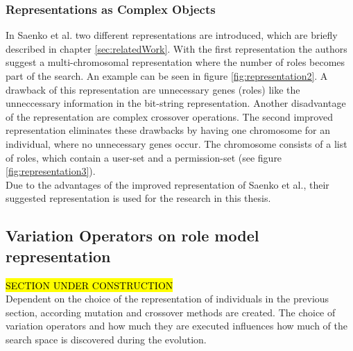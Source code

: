         \subsubsection{Representations as Complex Objects}
        In Saenko et al.\cite{saenko2012design} two different representations are introduced, which are briefly described in chapter \ref{sec:relatedWork}. With the first representation the authors suggest a multi-chromosomal representation where the number of roles becomes part of the search. An example can be seen in figure \ref{fig:representation2}. A drawback of this representation are unnecessary genes (roles) like the unneccessary information in the bit-string representation. Another disadvantage of the representation are complex crossover operations\cite{saenko2012design}. The second improved representation eliminates these drawbacks by having one chromosome for an individual, where no unnecessary genes occur. The chromosome consists of a list of roles, which contain a user-set and a permission-set (see figure \ref{fig:representation3}).\\
        \newline
        Due to the advantages of the improved representation of Saenko et al.\cite{saenko2012design}, their suggested representation is used for the research in this thesis.
    
    \subsection{Variation Operators on role model representation}
    \hl{SECTION UNDER CONSTRUCTION}\\
    Dependent on the choice of the representation of individuals in the previous section, according mutation and crossover methods are created. The choice of variation operators and how much they are executed influences how much of the search space is discovered during the evolution.
